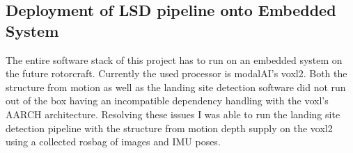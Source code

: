 \subsection{Deployment of LSD pipeline onto Embedded System}\label{subsubsec:voxl2}
The entire software stack of this project has to run on an embedded system on the future rotorcraft. Currently the used processor is modalAI's voxl2. Both the structure from motion as well as the landing site detection software did not run out of the box having an incompatible dependency handling with the voxl's AARCH architecture. Resolving these issues I was able to run the landing site detection pipeline with the structure from motion depth supply on the voxl2 using a collected rosbag of images and IMU poses.